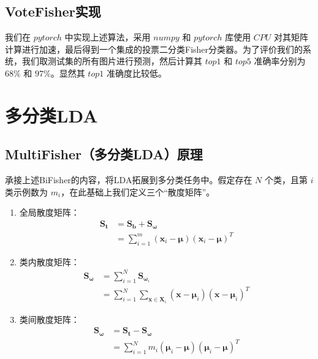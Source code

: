 \documentclass[UTF8, a4paper, 12pt]{report}
\begin{document}
		\subsection{VoteFisher实现}
			我们在 $pytorch$ 中实现上述算法，采用 $numpy$ 和 $pytorch$ 库使用 $CPU$ 对其矩阵计算进行加速，最后得到一个集成的投票二分类Fisher分类器。为了评价我们的系统，我们取测试集的所有图片进行预测，然后计算其 $top1$ 和 $top5$ 准确率分别为 $68\%$ 和 $97\%$。显然其 $top1$ 准确度比较低。

	\section{多分类LDA}
		\subsection{MultiFisher（多分类LDA）原理}
			承接上述BiFisher的内容，将LDA拓展到多分类任务中。假定存在 $N$ 个类，且第 $i$ 类示例数为 $m_i$，在此基础上我们定义三个“散度矩阵”。
			\begin{enumerate}[itemindent=1em]
				\renewcommand{\labelenumi}{\theenumi)}
				\item 全局散度矩阵：
					\begin{equation}
					\begin{aligned}
						\bm{S}_{\bm{t}} &= \bm{S}_{\bm{b}} + \bm{S}_{\bm{\omega}}  \\
						&=\sum_{i=1}^{m} (\bm{x}_i - \bm{\mu}) (\bm{x}_i - \bm{\mu})^T
					\end{aligned}
					\end{equation}
				\item 类内散度矩阵：
					\begin{equation}
					\begin{aligned}
						\bm{S}_{\bm{\omega}} &= \sum_{i=1}^{N} {\bm{S}_{\bm{\omega}_i}}  \\
						&=\sum_{i=1}^{N} {\sum_{\bm{x} \in \bm{X}_i} {(\bm{x} - \bm{\mu}_i) (\bm{x} - \bm{\mu}_i)^T}}
					\end{aligned}
					\end{equation}
				\item 类间散度矩阵：
					\begin{equation}
					\begin{aligned}
						\bm{S}_{\bm{\omega}} &= \bm{S}_{\bm{t}} - \bm{S}_{\bm{\omega}}  \\
						&=\sum_{i=1}^{N} {m_i (\bm{\mu}_i - \bm{\mu}) (\bm{\mu}_i - \bm{\mu})^T}
					\end{aligned}
					\end{equation}
			\end{enumerate}
\end{document}
